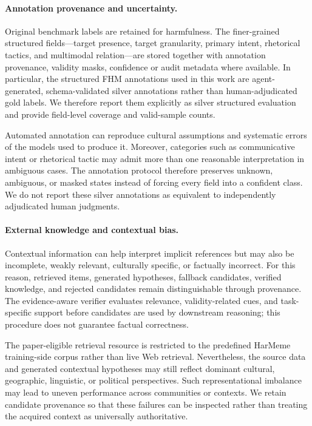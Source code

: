 \paragraph{Annotation provenance and uncertainty.}
Original benchmark labels are retained for harmfulness.
The finer-grained structured fields---target presence, target granularity,
primary intent, rhetorical tactics, and multimodal relation---are stored
together with annotation provenance, validity masks, confidence or audit
metadata where available.
In particular, the structured FHM annotations used in this work are
agent-generated, schema-validated silver annotations rather than
human-adjudicated gold labels.
We therefore report them explicitly as silver structured evaluation and
provide field-level coverage and valid-sample counts.

Automated annotation can reproduce cultural assumptions and systematic
errors of the models used to produce it.
Moreover, categories such as communicative intent or rhetorical tactic may
admit more than one reasonable interpretation in ambiguous cases.
The annotation protocol therefore preserves unknown, ambiguous, or masked
states instead of forcing every field into a confident class.
We do not report these silver annotations as equivalent to independently
adjudicated human judgments.

\paragraph{External knowledge and contextual bias.}
Contextual information can help interpret implicit references but may also
be incomplete, weakly relevant, culturally specific, or factually
incorrect.
For this reason, retrieved items, generated hypotheses, fallback
candidates, verified knowledge, and rejected candidates remain
distinguishable through provenance.
The evidence-aware verifier evaluates relevance, validity-related cues, and
task-specific support before candidates are used by downstream reasoning;
this procedure does not guarantee factual correctness.

The paper-eligible retrieval resource is restricted to the predefined
HarMeme training-side corpus rather than live Web retrieval.
Nevertheless, the source data and generated contextual hypotheses may still
reflect dominant cultural, geographic, linguistic, or political
perspectives.
Such representational imbalance may lead to uneven performance across
communities or contexts.
We retain candidate provenance so that these failures can be inspected
rather than treating the acquired context as universally authoritative.

